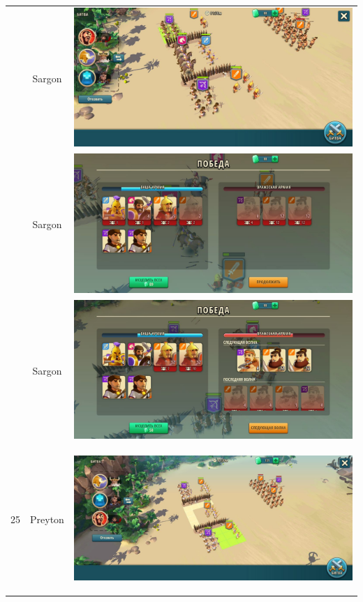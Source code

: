 \begin{longtable}{|c|c|c|}
	& Sargon &
	\includegraphics[width=0.75\linewidth]{./parts/media/TreasureHunt/25/sargon/photo_2022-04-07_09-58-31.jpg} \\
	& Sargon &
	\includegraphics[width=0.75\linewidth]{./parts/media/TreasureHunt/25/sargon/photo_2022-04-07_09-58-35.jpg} \\
	& Sargon &
	\includegraphics[width=0.75\linewidth]{./parts/media/TreasureHunt/25/sargon/photo_2022-04-07_09-58-27.jpg} \\
	\hline
	\multirow{14}{*}{25} & Preyton &
	\hypertarget{fight25}{\includegraphics[width=0.75\linewidth]{./parts/media/TreasureHunt/25/Preyton/25.2.jpg}} \\

\end{longtable}
